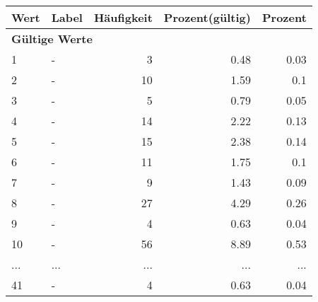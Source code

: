      \begin{longtable}{lXrrr}
     \toprule
     \textbf{Wert} & \textbf{Label} & \textbf{Häufigkeit} & \textbf{Prozent(gültig)} & \textbf{Prozent} \\
     \endhead
     \midrule
     \multicolumn{5}{l}{\textbf{Gültige Werte}}\\
        1 & \multicolumn{1}{X}{-} & %
          \num{3} &
          \num[round-mode=places,round-precision=2]{0.48} &
          \num[round-mode=places,round-precision=2]{0.03} \\
        2 & \multicolumn{1}{X}{-} & %
          \num{10} &
          \num[round-mode=places,round-precision=2]{1.59} &
          \num[round-mode=places,round-precision=2]{0.1} \\
        3 & \multicolumn{1}{X}{-} & %
          \num{5} &
          \num[round-mode=places,round-precision=2]{0.79} &
          \num[round-mode=places,round-precision=2]{0.05} \\
        4 & \multicolumn{1}{X}{-} & %
          \num{14} &
          \num[round-mode=places,round-precision=2]{2.22} &
          \num[round-mode=places,round-precision=2]{0.13} \\
        5 & \multicolumn{1}{X}{-} & %
          \num{15} &
          \num[round-mode=places,round-precision=2]{2.38} &
          \num[round-mode=places,round-precision=2]{0.14} \\
        6 & \multicolumn{1}{X}{-} & %
          \num{11} &
          \num[round-mode=places,round-precision=2]{1.75} &
          \num[round-mode=places,round-precision=2]{0.1} \\
        7 & \multicolumn{1}{X}{-} & %
          \num{9} &
          \num[round-mode=places,round-precision=2]{1.43} &
          \num[round-mode=places,round-precision=2]{0.09} \\
        8 & \multicolumn{1}{X}{-} & %
          \num{27} &
          \num[round-mode=places,round-precision=2]{4.29} &
          \num[round-mode=places,round-precision=2]{0.26} \\
        9 & \multicolumn{1}{X}{-} & %
          \num{4} &
          \num[round-mode=places,round-precision=2]{0.63} &
          \num[round-mode=places,round-precision=2]{0.04} \\
        10 & \multicolumn{1}{X}{-} & %
          \num{56} &
          \num[round-mode=places,round-precision=2]{8.89} &
          \num[round-mode=places,round-precision=2]{0.53} \\
       ... & ... & ... & ... & ... \\
        41 & \multicolumn{1}{X}{-} & %
          \num{4} &
          \num[round-mode=places,round-precision=2]{0.63} &
          \num[round-mode=places,round-precision=2]{0.04} \\


\end{longtable}
